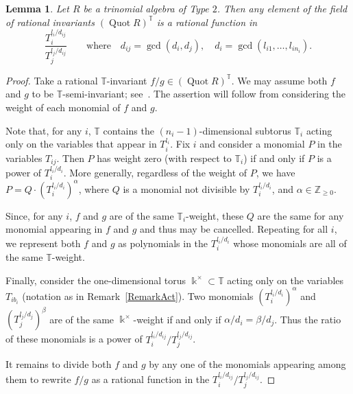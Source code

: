 \documentclass[a4paper,reqno,12pt]{amsart}
\theoremstyle{plain}
\theoremstyle{definition}
\theoremstyle{plain}
\newtheorem{lemma}[theorem]{Lemma}
\theoremstyle{remark}
\DeclareMathOperator*{\Prod}{\prod}
\DeclareMathOperator{\Quot}{Quot}
\newcommand{\TT}{\mathbb{T}}
\newcommand{\kk}{\Bbbk}
\begin{document}
\begin{lemma}\label{LemmaRationalInvariants}
Let $R$ be a trinomial algebra of Type $2$. Then any element of the field of rational invariants $(\Quot R)^{{\TT}}$ is a rational function in
$$\frac{T_i^{l_i/d_{ij}}} {T_j^{l_j/d_{ij}}}\qquad \mbox{where}\quad d_{ij}=\gcd(d_i, d_j), \quad d_i=\gcd(l_{i1},\ldots, l_{in_i}).$$
\end{lemma}
\begin{proof}
    Take a rational ${\TT}$-invariant $f/g\in(\Quot R)^{\TT}$. We may assume both $f$ and $g$ to be ${\TT}$-semi-invariant; see~\cite[Theorem 3.3]{PV}. The assertion will follow from considering the weight of each monomial of $f$ and $g$.

    Note that, for any $i$, ${\TT}$ contains the $(n_i-1)$-dimensional subtorus ${\TT}_i$ acting only on the variables that appear in $T_i^{l_i}$. %
    Fix $i$ and consider a monomial $P$ in the variables $T_{ij}$. Then $P$ has weight zero (with respect to ${\TT}_i$) if and only if $P$ is a power of $T_i^{l_i/d_i}$. More generally, regardless of the weight of $P$, we have $P=Q\cdot(T_i^{l_i/d_i})^\alpha$, where $Q$ is a monomial not divisible by $T_i^{l_i/d_i}$, and $\alpha\in\mathbb Z_{\ge0}$.


    Since, for any $i$, $f$ and $g$ are of the same ${\TT}_i$-weight, these $Q$ are the same for any monomial appearing in $f$ and $g$ and thus may be cancelled. Repeating for all $i$, we represent both $f$ and $g$ as polynomials in the $T_i^{l_i/d_i}$ whose monomials are all of the same ${\TT}$-weight.

    Finally, consider the one-dimensional torus $\kk^\times\subset{\TT}$ acting only on the variables $T_{ib_i}$ (notation as in Remark~\ref{RemarkAct}). Two monomials
    $(T_i^{l_i/d_i})^\alpha$ and $(T_j^{l_j/d_j})^\beta$ are of the same $\kk^\times$-weight if and only if $\alpha/d_i=\beta/d_j$. Thus the ratio of these monomials is a power of 
   $T_i^{l_i/d_{ij}}/ T_j^{l_j/d_{ij}}$.
   
   It remains to divide both $f$ and $g$ by any one of the monomials appearing among them to rewrite $f/g$ as a rational function in the ${T_i^{l_i/d_{ij}}}/ {T_j^{l_j/d_{ij}}}$.
\end{proof}
\end{document}

